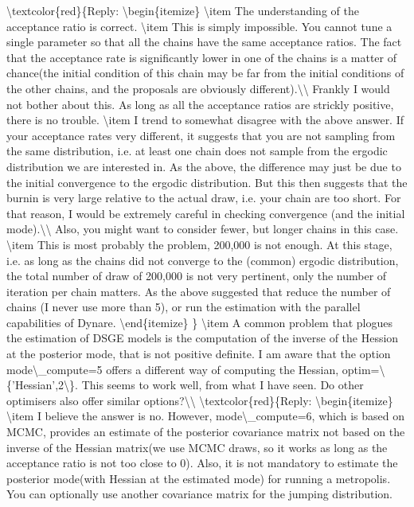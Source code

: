 \documentclass[10pt,math=newtx,citestyle=gb7714-2015,bibstyle=gb7714-2015]{elegantbook}
\begin{document}
	\textbackslash{}textcolor\{red\}\{Reply:
	\textbackslash{}begin\{itemize\}
	\textbackslash{}item The understanding of the acceptance ratio is correct.
	\textbackslash{}item This is simply impossible. You cannot tune a single parameter so that all the chains have the same acceptance ratios. The fact that the acceptance rate is significantly lower in one of the chains is a matter of chance(the initial condition of this chain may be far from the initial conditions of the other chains, and the proposals are obviously different).\textbackslash{}\textbackslash{}
	Frankly I would not bother about this. As long as all the acceptance ratios are strickly positive, there is no trouble.
	\textbackslash{}item I trend to somewhat disagree with the above answer. If your acceptance rates very different, it suggests that you are not sampling from the same distribution, i.e. at least one chain does not sample from the ergodic distribution we are interested in. As the above, the difference may just be due to the initial convergence to the ergodic distribution. But this then suggests that the burnin is very large relative to the actual draw, i.e. your chain are too short. For that reason, I would be extremely careful in checking convergence (and the initial mode).\textbackslash{}\textbackslash{}
	Also, you might want to consider fewer, but longer chains in this case.
	\textbackslash{}item This is most probably the problem, 200,000 is not enough. At this stage, i.e. as long as the chains did not converge to the (common) ergodic distribution, the total number of draw of 200,000 is not very pertinent, only the number of iteration per chain matters. As the above suggested that reduce the number of chains (I never use more than 5), or run the estimation with the parallel capabilities of Dynare.
	\textbackslash{}end\{itemize\}
	\}
	\textbackslash{}item A common problem that plogues the estimation of DSGE models is the computation of the inverse of the Hession at the posterior mode, that is not positive definite. I am aware that the option mode\textbackslash{}\_compute=5 offers a different way of computing the Hessian, optim=\textbackslash{}\{'Hessian',2\textbackslash{}\}. This seems to work well, from what I have seen. Do other optimisers also offer similar options?\textbackslash{}\textbackslash{}
	\textbackslash{}textcolor\{red\}\{Reply:
	\textbackslash{}begin\{itemize\}
	\textbackslash{}item I believe the answer is no. However, mode\textbackslash{}\_compute=6, which is based on MCMC, provides an estimate of the posterior covariance matrix not based on the inverse of the Hessian matrix(we use MCMC draws, so it works as long as the acceptance ratio is not too close to 0). Also, it is not mandatory to estimate the posterior mode(with Hessian at the estimated mode) for running a metropolis. You can optionally use another covariance matrix for the jumping distribution.
\end{document}
